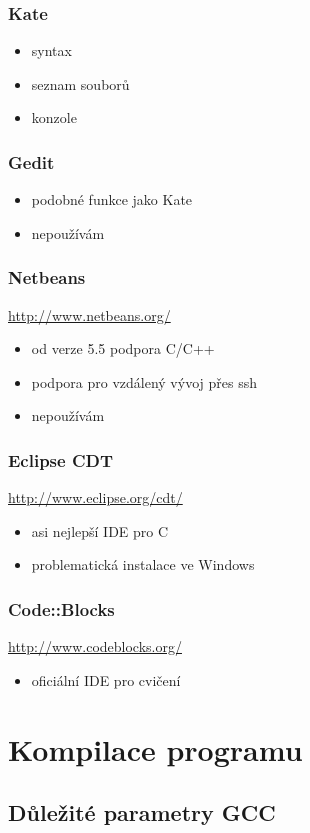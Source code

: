 \begin{frame}
	\frametitle{Kate}
	\begin{itemize}
		\item{syntax}
		\item{seznam souborů}
		\item{konzole}
	\end{itemize}
\end{frame}

\begin{frame}
	\frametitle{Gedit}
	\begin{itemize}
		\item{podobné funkce jako Kate}
		\item{nepoužívám}
	\end{itemize}
\end{frame}

\begin{frame}
	\frametitle{Netbeans}
	\href{http://www.netbeans.org/}{http://www.netbeans.org/}
	\begin{itemize}
		\item{od verze 5.5 podpora C/C++}
		\item{podpora pro vzdálený vývoj přes ssh}
		\item{nepoužívám}
	\end{itemize}
\end{frame}

\begin{frame}
	\frametitle{Eclipse CDT}
	\href{http://www.eclipse.org/cdt/}{http://www.eclipse.org/cdt/}
	\begin{itemize}
		\item{asi nejlepší IDE pro C}
		\item{problematická instalace ve Windows}
	\end{itemize}
\end{frame}

\begin{frame}
	\frametitle{Code::Blocks}
	\href{http://www.codeblocks.org/}{http://www.codeblocks.org/}
	\begin{itemize}
		\item{oficiální IDE pro cvičení}
	\end{itemize}
\end{frame}

\section{Kompilace programu}
\subsection{Důležité parametry GCC}

